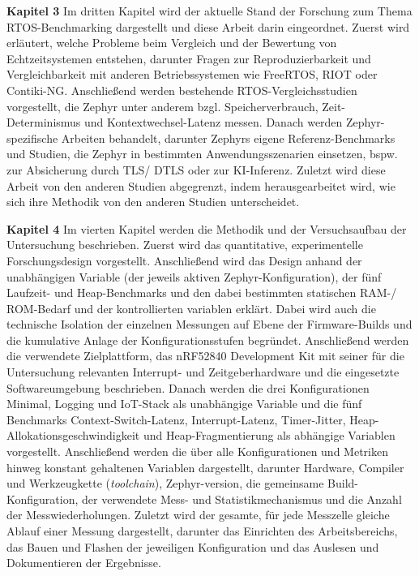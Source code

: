 \textbf{Kapitel 3 }Im dritten Kapitel wird der aktuelle Stand der Forschung zum Thema RTOS-Benchmarking dargestellt und diese Arbeit darin eingeordnet. Zuerst wird erl{\"a}utert, welche Probleme beim Vergleich und der Bewertung von Echtzeitsystemen entstehen, darunter Fragen zur Reproduzierbarkeit und Vergleichbarkeit mit anderen Betriebssystemen wie FreeRTOS, RIOT oder Contiki-NG. Anschlie{\ss}end werden bestehende RTOS-Vergleichsstudien vorgestellt, die Zephyr unter anderem bzgl. Speicherverbrauch, Zeit-Determinismus und Kontextwechsel-Latenz messen. Danach werden Zephyr-spezifische Arbeiten behandelt, darunter Zephyrs eigene Referenz-Benchmarks und Studien, die Zephyr in bestimmten Anwendungsszenarien einsetzen, bspw. zur Absicherung durch TLS/ DTLS oder zur KI-Inferenz. Zuletzt wird diese Arbeit von den anderen Studien abgegrenzt, indem herausgearbeitet wird, wie sich ihre Methodik von den anderen Studien unterscheidet.

\textbf{Kapitel 4 }Im vierten Kapitel werden die Methodik und der Versuchsaufbau der Untersuchung beschrieben. Zuerst wird das quantitative, experimentelle Forschungsdesign vorgestellt. Anschlie{\ss}end wird das Design anhand der unabh{\"a}ngigen Variable (der jeweils aktiven Zephyr-Konfiguration), der f{\"u}nf Laufzeit- und Heap-Benchmarks und den dabei bestimmten statischen RAM-/ ROM-Bedarf und der kontrollierten variablen erkl{\"a}rt. Dabei wird auch die technische Isolation der einzelnen Messungen auf Ebene der Firmware-Builds und die kumulative Anlage der Konfigurationsstufen begr{\"u}ndet. Anschlie{\ss}end werden die verwendete Zielplattform, das nRF52840 Development Kit mit seiner f{\"u}r die Untersuchung relevanten Interrupt- und Zeitgeberhardware und die eingesetzte Softwareumgebung beschrieben. Danach werden die drei Konfigurationen Minimal, Logging und IoT-Stack als unabh{\"a}ngige Variable und die f{\"u}nf Benchmarks Context-Switch-Latenz, Interrupt-Latenz, Timer-Jitter, Heap-Allokationsgeschwindigkeit und Heap-Fragmentierung als abh{\"a}ngige Variablen vorgestellt. Anschlie{\ss}end werden die {\"u}ber alle Konfigurationen und Metriken hinweg konstant gehaltenen Variablen dargestellt, darunter Hardware, Compiler und Werkzeugkette (\emph{toolchain}), Zephyr-version, die gemeinsame Build-Konfiguration, der verwendete Mess- und Statistikmechanismus und die Anzahl der Messwiederholungen. Zuletzt wird der gesamte, f{\"u}r jede Messzelle gleiche Ablauf einer Messung dargestellt, darunter das Einrichten des Arbeitsbereichs, das Bauen und Flashen der jeweiligen Konfiguration und das Auslesen und Dokumentieren der Ergebnisse.

